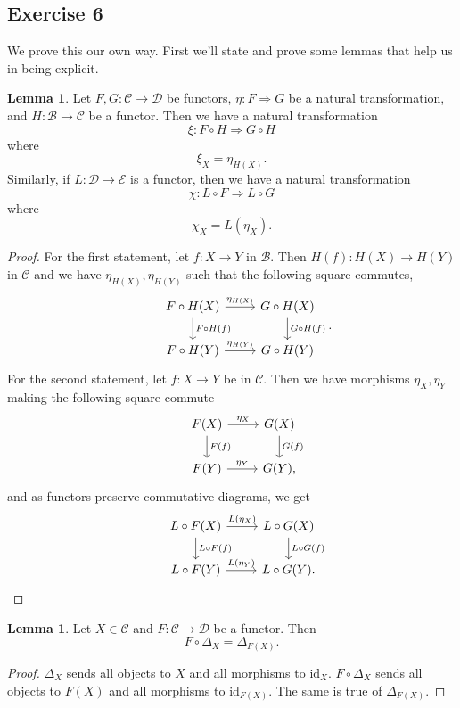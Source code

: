 \documentclass{article}
\theoremstyle{definition}
\newtheorem{lemma}[theorem]{Lemma}
\newcommand{\id}{\text{id}}
\begin{document}
\subsection*{Exercise 6}

We prove this our own way. First we'll state and prove some lemmas that help
us in being explicit.

\begin{lemma}
	Let $F, G : \mathcal{C} \to \mathcal{D}$ be functors, $\eta : F \Rightarrow
	G$ be a natural transformation, and $H : \mathcal{B} \to \mathcal{C}$ be a
	functor. Then we have a natural transformation
	\[
		\xi : F \circ H \Rightarrow
		G \circ H
	\]
	where
	\[
		\xi_{X} = \eta_{H(X)}.
	\]
	Similarly, if $L : \mathcal{D} \to \mathcal{E}$ is a functor, then we have
	a natural transformation
	\[
		\chi : L \circ F \Rightarrow L \circ G
	\]
	where
	\[
		\chi_{X} = L(\eta_X).
	\]
\end{lemma}
\begin{proof}
	For the first statement, let $f : X \to Y$ in $\mathcal{B}$. Then $H(f) : H(X) \to H(Y)$ in
	$\mathcal{C}$ and we have $\eta_{H(X)}, \eta_{H(Y)}$ such that the following square
	commutes,
	\[
	\begin{tikzcd}
		& F \circ H (X)
		\arrow{r}{\eta_{H(X)}}
		\arrow{d}{F \circ H (f)}
		& G \circ H (X)
		\arrow{d}{G \circ H (f)} \\
		& F \circ H (Y)
		\arrow{r}{\eta_{H(Y)}}
		& G \circ H(Y)
	\end{tikzcd}.
	\] 
	For the second statement, let $f : X \to Y$ be in $\mathcal{C}$. Then we have morphisms 
	$\eta_X, \eta_Y$ making the following square commute
	\[
	\begin{tikzcd}
		& F(X)
		\arrow{r}{\eta_{X}}
		\arrow{d}{F(f)}
		& G(X)
		\arrow{d}{G(f)} \\
		& F(Y)
		\arrow{r}{\eta_{Y}}
		& G(Y),
	\end{tikzcd}
	\]
	and as functors preserve commutative diagrams, we get
	\[
	\begin{tikzcd}
		& L \circ F(X)
		\arrow{r}{L(\eta_{X})}
		\arrow{d}{L \circ F(f)}
		& L \circ G(X)
		\arrow{d}{L \circ G(f)} \\
		& L \circ F(Y)
		\arrow{r}{L(\eta_{Y})}
		& L \circ G(Y).
	\end{tikzcd}
	\]
\end{proof}

\begin{lemma}
	Let $X \in \mathcal{C}$ and $F : \mathcal{C} \to \mathcal{D}$ be a functor.
	Then
	\[
		F \circ \Delta_{X} = \Delta_{F(X)}.
	\]
\end{lemma}
\begin{proof}
	$\Delta_X$ sends all objects to $X$ and all morphisms to $\id_X$. $F \circ
	\Delta_X$ sends all objects to $F(X)$ and all morphisms to $\id_{F(X)}$.
	The same is true of $\Delta_{F(X)}$.
\end{proof}
\end{document}
